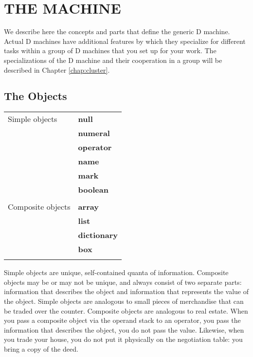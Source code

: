 \chapter{THE  MACHINE}\label{chap:machine}

We describe here the concepts and parts that define the generic D machine. Actual D machines have additional features by which they specialize for different tasks within a group of D machines that you set up for your work. The specializations of the D machine and their cooperation in a group will be described in Chapter \ref{chap:cluster}.


\section{The Objects}\label{sec:objects}

\begin{tabular}{>{\normalfont}l>{\bfseries}l}
Simple objects & null\\    
               & numeral\\ 
               & operator\\
               & name\\
               & mark\\
               & boolean\\\\

Composite objects & array\\
                  & list\\
                  & dictionary\\
                  & box\\\\
\end{tabular}

\noindent Simple  objects  are  unique,   self-contained  quanta  of  information. Composite objects may be or may not be unique,  and always consist of two separate  parts:  information that describes the object  and  information that represents the value of the object.  Simple objects are analogous to small  pieces  of  merchandise  that can  be  traded  over  the  counter. Composite objects are analogous to real estate. When you pass a composite object  via the operand stack to an operator,  you pass  the  information that describes the object,  you do not pass the value. Likewise, when you trade your house,  you do not put it physically on the negotiation table: you bring a copy of the deed.

